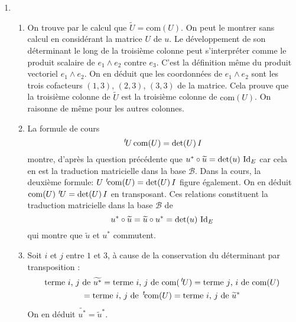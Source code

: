 \begin{enumerate}
 \item 
\begin{enumerate}
 \item On trouve par le calcul que $\widetilde{U}=\mathrm{com}(U)$. On peut le montrer sans calcul en considérant la matrice $U$ de $u$. Le développement de son déterminant le long de la troisième colonne peut s'interpréter comme le produit scalaire de $e_1\wedge e_2$ contre $e_3$. C'est la définition même du produit vectoriel $e_1\wedge e_2$. On en déduit que les coordonnées de $e_1\wedge e_2$ sont les trois cofacteurs $(1,3)$, $(2,3)$, $(3,3)$ de la matrice. Cela prouve que la troisième colonne de $\widetilde{U}$ est la troisième colonne de $\mathrm{com}(U)$. On raisonne de même pour les autres colonnes. 
 \item La formule de cours
\begin{displaymath}
 \,\mathstrut^t\!{U} \,\mathrm{com}(U) = \det(U)\, I
\end{displaymath}
montre, d'après la question précédente que $u^*\circ \widetilde{u} = \det(u)\,\operatorname{Id}_E$ car cela en est la traduction matricielle dans la base $\mathcal{B}$.\newline
Dans la cours, la deuxième formule:  $U \,\,\mathstrut^t\!{\mathrm{com}(U)} = \det(U)\, I$ figure également. On en déduit $\mathrm{com}(U)\, \,\mathstrut^t\!{U} = \det(U)\, I$ en transposant. Ces relations constituent la traduction matricielle dans la base $\mathcal{B}$ de
\begin{displaymath}
 u^* \circ \widetilde{u} = \widetilde{u} \circ u^* = \det(u)\,\operatorname{Id}_E
\end{displaymath}
qui montre que $\widetilde{u}$ et $u^*$ commutent. 
 \item Soit $i$ et $j$ entre $1$ et $3$, à cause de la conservation du déterminant par transposition :
\begin{multline*}
 \text{terme $i$, $j$ de }\widetilde{u^*}
= \text{terme $i$, $j$ de }\mathrm{com}(\,\mathstrut^t\!{U})
= \text{terme $j$, $i$ de }\mathrm{com}(U)\\
= \text{terme $i$, $j$ de }\,\mathstrut^t\!{\mathrm{com}(U)}
= \text{terme $i$, $j$ de }\widetilde{u}^*
\end{multline*}
 On en déduit $\widetilde{u^*} = \widetilde{u}^*$.
\end{enumerate}


\end{enumerate}
